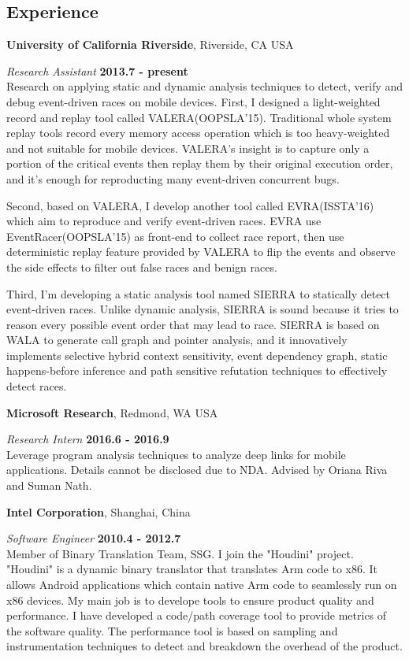 \documentclass[margin,line]{res}
\begin{document}
\begin{resume}
\section{\sc Experience}
{\bf University of California Riverside}, Riverside, CA USA

\vspace{-.3cm}
{\em Research Assistant} \hfill {\bf 2013.7 - present}\\
Research on applying static and dynamic analysis techniques to detect, verify and debug
event-driven races on mobile devices.
First, I designed a light-weighted record and replay tool called VALERA(OOPSLA'15).
Traditional whole system replay tools record every memory access operation which is
too heavy-weighted and not suitable for mobile devices. VALERA's insight is to capture
only a portion of the critical events then replay them by their original execution order, 
and it's enough for reproducting many event-driven concurrent bugs.

\vspace{-.3cm}
Second, based on VALERA, I develop another tool called EVRA(ISSTA'16) which aim
to reproduce and verify event-driven races. EVRA use EventRacer(OOPSLA'15) as front-end
to collect race report, then use deterministic replay feature provided by VALERA to flip the
events and observe the side effects to filter out false races and benign races.

\vspace{-.3cm}
Third, I'm developing a static analysis tool named SIERRA to statically detect event-driven races.
Unlike dynamic analysis, SIERRA is sound because it tries to reason every possible event order
that may lead to race. SIERRA is based on WALA to generate call graph and pointer analysis,
and it innovatively implements selective hybrid context sensitivity, event dependency graph, static 
happens-before inference and path sensitive refutation techniques to effectively detect races.



{\bf Microsoft Research}, Redmond, WA USA

\vspace{-.3cm}
{\em Research Intern} \hfill {\bf 2016.6 - 2016.9}\\
Leverage program analysis techniques to analyze deep links for mobile applications.
Details cannot be disclosed due to NDA.
Advised by Oriana Riva and Suman Nath.


{\bf Intel Corporation}, Shanghai, China

\vspace{-.3cm}
{\em Software Engineer} \hfill {\bf 2010.4 - 2012.7}\\
Member of Binary Translation Team, SSG. I join the "Houdini" project.
"Houdini" is a dynamic binary translator that translates Arm code to 
x86. It allows Android applications which contain native Arm code to 
seamlessly run on x86 devices. My main job is to develope tools to ensure 
product quality and performance. I have developed a code/path coverage 
tool to provide metrics of the software quality. The performance tool 
is based on sampling and instrumentation techniques to detect and 
breakdown the overhead of the product.



\end{resume}
\end{document}
